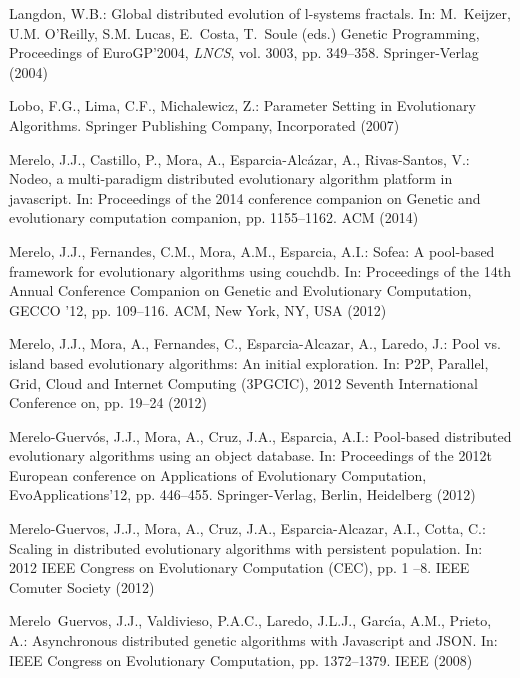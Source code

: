 \begin{thebibliography}{10}
Langdon, W.B.: Global distributed evolution of l-systems fractals.
\newblock In: M.~Keijzer, U.M. O'Reilly, S.M. Lucas, E.~Costa, T.~Soule (eds.)
  Genetic Programming, Proceedings of EuroGP'2004, \emph{LNCS}, vol. 3003, pp.
  349--358. Springer-Verlag (2004)

Lobo, F.G., Lima, C.F., Michalewicz, Z.: Parameter Setting in Evolutionary
  Algorithms.
\newblock Springer Publishing Company, Incorporated (2007)

Merelo, J.J., Castillo, P., Mora, A., Esparcia-Alc{\'a}zar, A., Rivas-Santos,
  V.: Nodeo, a multi-paradigm distributed evolutionary algorithm platform in
  javascript.
\newblock In: Proceedings of the 2014 conference companion on Genetic and
  evolutionary computation companion, pp. 1155--1162. ACM (2014)

Merelo, J.J., Fernandes, C.M., Mora, A.M., Esparcia, A.I.: Sofea: A pool-based
  framework for evolutionary algorithms using couchdb.
\newblock In: Proceedings of the 14th Annual Conference Companion on Genetic
  and Evolutionary Computation, GECCO '12, pp. 109--116. ACM, New York, NY, USA
  (2012)

Merelo, J.J., Mora, A., Fernandes, C., Esparcia-Alcazar, A., Laredo, J.: Pool
  vs. island based evolutionary algorithms: An initial exploration.
\newblock In: P2P, Parallel, Grid, Cloud and Internet Computing (3PGCIC), 2012
  Seventh International Conference on, pp. 19--24 (2012)

Merelo-Guerv\'{o}s, J.J., Mora, A., Cruz, J.A., Esparcia, A.I.: Pool-based
  distributed evolutionary algorithms using an object database.
\newblock In: Proceedings of the 2012t European conference on Applications of
  Evolutionary Computation, EvoApplications'12, pp. 446--455. Springer-Verlag,
  Berlin, Heidelberg (2012)

Merelo-Guervos, J.J., Mora, A., Cruz, J.A., Esparcia-Alcazar, A.I., Cotta, C.:
  Scaling in distributed evolutionary algorithms with persistent population.
\newblock In: 2012 IEEE Congress on Evolutionary Computation (CEC), pp. 1 --8.
  IEEE Comuter Society (2012)

Merelo~Guervos, J.J., Valdivieso, P.A.C., Laredo, J.L.J., Garc{\'\i}a, A.M.,
  Prieto, A.: Asynchronous distributed genetic algorithms with {Javascript} and
  {JSON}.
\newblock In: IEEE Congress on Evolutionary Computation, pp. 1372--1379. IEEE
  (2008)


\end{thebibliography}
